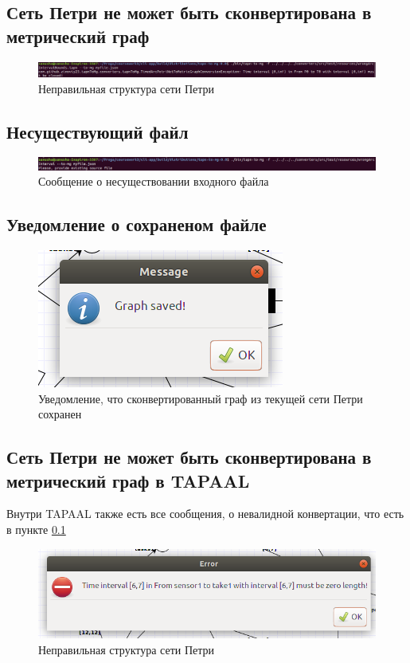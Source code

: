 \documentclass{../TechDoc}
\begin{document}
		\subsection{Сеть Петри не может быть сконвертирована в метрический граф}\label{tapn-error}
		\begin{figure}[h!]
			\centering
			\includegraphics[width=0.7\linewidth]{tapn-format1}
			\caption{Неправильная структура сети Петри}
			\label{fig:tapn-format1}
		\end{figure}
		
		\subsection{Несуществующий файл}
		\begin{figure}[h!]
			\centering
			\includegraphics[width=0.7\linewidth]{missing_file}
			\caption{Сообщение о несуществовании входного файла}
			\label{fig:missingfile}
		\end{figure}
	
		\subsection{Уведомление о сохраненом файле}
		\begin{figure}[h!]
			\centering
			\includegraphics[width=0.7\linewidth]{graph_saved}
			\caption{Уведомление, что сконвертированный граф из текущей сети Петри сохранен}
			\label{fig:graphsaved}
		\end{figure}
		
		\subsection{Сеть Петри не может быть сконвертирована в метрический граф в TAPAAL}
		Внутри TAPAAL также есть все сообщения, о невалидной конвертации, что есть в пункте \ref{tapn-error}
		\begin{figure}[h!]
			\centering
			\includegraphics[width=0.7\linewidth]{tapn-format2}
			\caption{Неправильная структура сети Петри}
			\label{fig:tapn-format2}
		\end{figure}
		
\end{document}
